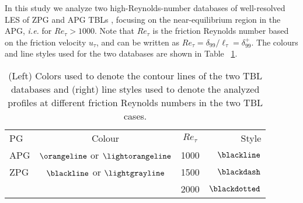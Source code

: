 In this study we analyze two high-Reynolds-number databases of well-resolved LES of ZPG \cite{EAmorZPG} and APG TBLs \cite{Pozuelo_JFM_22}, focusing on the near-equilibrium region in the APG, {\it i.e.} for $Re_{\tau}>1000$. Note that $Re_{\tau}$ is the friction Reynolds number based on the friction velocity $u_{\tau}$, and can be written as $Re_{\tau}=\delta_{99}/\ell_{\tau}=\delta_{99}^+$.
The colours and line styles used for the two databases are shown in Table~ \ref{tab:PGcases}.
\begin{table}
\centering
\begin{tabular}{lc||cr}
\textrm{PG } & \textrm{Colour} & \textrm{$Re_{\tau}$} & \textrm{Style} \\
APG & $\orangeline$ or $\lightorangeline$ & 1000 & $\blackline$  \\
ZPG & $\blackline$ or $\lightgrayline$  & 1500 & $\blackdash$  \\
    &                & 2000 & $\blackdotted$ \\
\end{tabular}
\caption{(Left) Colors used to denote the contour lines of the two TBL databases and (right) line styles used to denote the analyzed profiles at different friction Reynolds numbers in the two TBL cases. }
\label{tab:PGcases}
\end{table} 